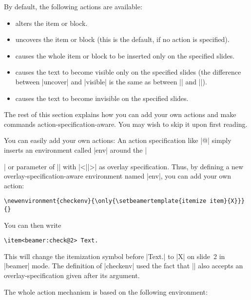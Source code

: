 By default, the following actions are available:
\begin{itemize}
\item {} alters the item or block.
\item {} uncovers the item or block (this is the default, if no action is specified).
\item {} causes the whole item or block to be inserted only on the specified slides.
\item {} causes the text to become visible only on the specified slides (the difference between |uncover| and |visible| is the same as between |\uncover| and |\visible|).
\item {} causes the text to become invisible on the specified slides.
\end{itemize}

The rest of this section explains how you can add your own actions and make commands action-specification-aware. You may wish to skip it upon first reading.

You can easily add your own actions: An action specification like |@| simply inserts an environment called |env| around the |\item| or parameter of |\action| with |<||>| as overlay specification. Thus, by defining a new overlay-specification-aware environment named |env|, you can add your own action:
\begin{verbatim}
\newenvironment{checkenv}{\only{\setbeamertemplate{itemize item}{X}}}{}
\end{verbatim}

You can then write
\begin{verbatim}
\item<beamer:check@2> Text.
\end{verbatim}

This will change the itemization symbol before |Text.| to |X| on slide~2 in |beamer| mode. The definition of |checkenv| used the fact that |\only| also accepts an overlay-specification given after its argument.

The whole action mechanism is based on the following environment:

